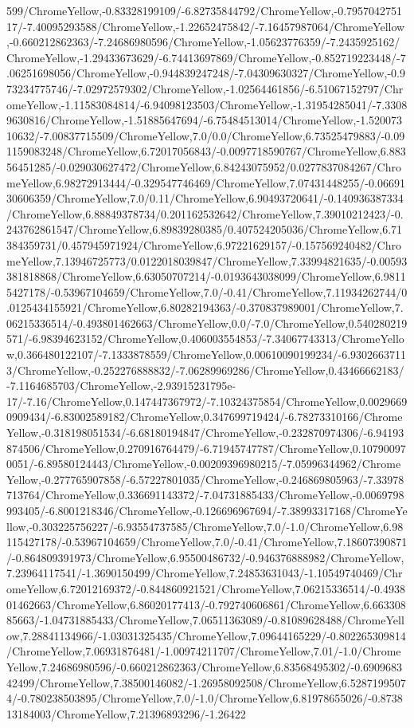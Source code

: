 {\begin{tikzternal}
599/ChromeYellow,-0.83328199109/-6.82735844792/ChromeYellow,-0.795704275117/-7.40095293588/ChromeYellow,-1.22652475842/-7.16457987064/ChromeYellow,-0.660212862363/-7.24686980596/ChromeYellow,-1.05623776359/-7.2435925162/ChromeYellow,-1.29433673629/-6.74413697869/ChromeYellow,-0.852719223448/-7.06251698056/ChromeYellow,-0.944839247248/-7.04309630327/ChromeYellow,-0.973234775746/-7.02972579302/ChromeYellow,-1.02564461856/-6.51067152797/ChromeYellow,-1.11583084814/-6.94098123503/ChromeYellow,-1.31954285041/-7.33089630816/ChromeYellow,-1.51885647694/-6.75484513014/ChromeYellow,-1.52007310632/-7.00837715509/ChromeYellow,7.0/0.0/ChromeYellow,6.73525479883/-0.091159083248/ChromeYellow,6.72017056843/-0.0097718590767/ChromeYellow,6.88356451285/-0.029030627472/ChromeYellow,6.84243075952/0.0277837084267/ChromeYellow,6.98272913444/-0.329547746469/ChromeYellow,7.07431448255/-0.0669130606359/ChromeYellow,7.0/0.11/ChromeYellow,6.90493720641/-0.140936387334/ChromeYellow,6.88849378734/0.201162532642/ChromeYellow,7.39010212423/-0.243762861547/ChromeYellow,6.89839280385/0.407524205036/ChromeYellow,6.71384359731/0.457945971924/ChromeYellow,6.97221629157/-0.157569240482/ChromeYellow,7.13946725773/0.0122018039847/ChromeYellow,7.33994821635/-0.00593381818868/ChromeYellow,6.63050707214/-0.0193643038099/ChromeYellow,6.98115427178/-0.53967104659/ChromeYellow,7.0/-0.41/ChromeYellow,7.11934262744/0.0125434155921/ChromeYellow,6.80282194363/-0.370837989001/ChromeYellow,7.06215336514/-0.493801462663/ChromeYellow,0.0/-7.0/ChromeYellow,0.540280219571/-6.98394623152/ChromeYellow,0.406003554853/-7.34067743313/ChromeYellow,0.366480122107/-7.1333878559/ChromeYellow,0.00610090199234/-6.93026637113/ChromeYellow,-0.252276888832/-7.06289969286/ChromeYellow,0.43466662183/-7.1164685703/ChromeYellow,-2.93915231795e-17/-7.16/ChromeYellow,0.147447367972/-7.10324375854/ChromeYellow,0.00296690909434/-6.83002589182/ChromeYellow,0.347699719424/-6.78273310166/ChromeYellow,-0.318198051534/-6.68180194847/ChromeYellow,-0.232870974306/-6.94193874506/ChromeYellow,0.270916764479/-6.71945747787/ChromeYellow,0.107900970051/-6.89580124443/ChromeYellow,-0.00209396980215/-7.05996344962/ChromeYellow,-0.277765907858/-6.57227801035/ChromeYellow,-0.246869805963/-7.33978713764/ChromeYellow,0.336691143372/-7.04731885433/ChromeYellow,-0.0069798993405/-6.8001218346/ChromeYellow,-0.126696967694/-7.38993317168/ChromeYellow,-0.303225756227/-6.93554737585/ChromeYellow,7.0/-1.0/ChromeYellow,6.98115427178/-0.53967104659/ChromeYellow,7.0/-0.41/ChromeYellow,7.18607390871/-0.864809391973/ChromeYellow,6.95500486732/-0.946376888982/ChromeYellow,7.23964117541/-1.3690150499/ChromeYellow,7.24853631043/-1.10549740469/ChromeYellow,6.72012169372/-0.844860921521/ChromeYellow,7.06215336514/-0.493801462663/ChromeYellow,6.86020177413/-0.792740606861/ChromeYellow,6.66330885663/-1.04731885433/ChromeYellow,7.06511363089/-0.81089628488/ChromeYellow,7.28841134966/-1.03031325435/ChromeYellow,7.09644165229/-0.802265309814/ChromeYellow,7.06931876481/-1.00974211707/ChromeYellow,7.01/-1.0/ChromeYellow,7.24686980596/-0.660212862363/ChromeYellow,6.83568495302/-0.690968342499/ChromeYellow,7.38500146082/-1.26958092508/ChromeYellow,6.52871995074/-0.780238503895/ChromeYellow,7.0/-1.0/ChromeYellow,6.81978655026/-0.873813184003/ChromeYellow,7.21396893296/-1.26422
\end{tikzternal}}
